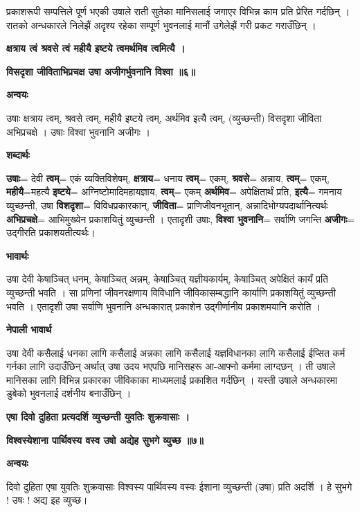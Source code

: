 \documentclass[11pt, a5paper]{article}
\begin{document}
प्रकाशरूपी सम्पत्तिले पूर्ण भएकी उषाले राती सुतेका मानिसलाई जगाएर विभिन्न काम प्रति प्रेरित गर्दछिन् । रातको अन्धकारले निलेझैं अदृश्य रहेका सम्पूर्ण भुवनलाई मानौं उगेलेझैं गरी प्रकट गराउँछिन् ।

\textbf{क्षत्राय त्वं श्रवसे त्वं महीयै इष्टये त्वमर्थमिव त्वमित्यै ।}

\textbf{विसदृशा जीविताभिप्रचक्ष उषा अजीगर्भुवनानि विश्वा ॥६॥}

\textbf{अन्वयः}

उषाः क्षत्राय त्वम्, श्रवसे त्वम्, महीयै इष्टये त्वम्, अर्थमिव इत्यै त्वम्, (व्युच्छन्ती) विसदृशा जीविता अभिप्रचक्षे । उषाः विश्वा भुवनानि अजीगः ।

\textbf{शब्दार्थः}

\textbf{उषाः}= देवी \textbf{त्वम्}= एकं व्यक्तिविशेषम्,  \textbf{क्षत्राय}= धनाय \textbf{त्वम्}= एकम्, \textbf{श्रवसे}= अन्नाय, \textbf{त्वम्}= एकम्, \textbf{महीयै}=महत्यै \textbf{इष्टये}= अग्निष्टोमादिमहायज्ञाय, \textbf{त्वम्}= एकम् \textbf{अर्थमिव}= अपेक्षितार्थं प्रति, \textbf{इत्यै}= गमनाय व्युच्छन्ती, उषा \textbf{विशदृशा}= विविधप्रकारकान्, \textbf{जीविता}= प्राणिजीवनभूतान्, अन्नादिभोग्यपदार्थानित्यर्थः \textbf{अभिप्रचक्षे}= आभिमुख्येन प्रकाशयितुं व्युच्छन्ती । एतादृशी उषाः, \textbf{विश्वा भुवनानि}= सर्वाणि जगन्ति \textbf{अजीगः}= उद्गीरति प्रकाशयतीत्यर्थः।

\textbf{भावार्थः}

उषा देवी केषाञ्चित् धनम्, केषाञ्चित् अन्नम्, केषाञ्चित् यज्ञीयकार्यम्, केषाञ्चित् अपेक्षितं कार्यं प्रति व्युच्छन्ती भवति । सा प्रणिनां जीवनरक्षणाय विविधानि जीविकासम्बद्धानि कार्याणि प्रकाशयितुं व्युच्छन्ती भवति । एतादृशी उषा सर्वाणि भुवनानि अन्धकारात् प्रकाशेन उद्गीर्णानीव प्रकाशमयानि करोति ।

\textbf{नेपाली भावार्थ}

उषा देवी कसैलाई धनका लागि कसैलाई अन्नका लागि कसैलाई यज्ञविधानका लागि कसैलाई ईप्सित कर्म गर्नका लागि उदाउँछिन् अर्थात् उषा उदय भएपछि मानिसहरू आ-आफ्नो कर्ममा लाग्दछन् । ती उषाले मानिसका लागि विभिन्न प्रकारका जीविकाका माध्यमलाई प्रकाशित गर्दछिन् । यस्ती उषाले अन्धकारमा डुबेको भुवनलाई दर्शनीय बनाउँछिन् ।

\textbf{एषा दिवो दुहिता प्रत्यदर्शि व्युच्छन्ती युवतिः शुक्रवासाः ।}

\textbf{विश्वस्येशाना पार्थिवस्य वस्व उषो अद्येह सुभगे व्युच्छ ॥७॥}

\textbf{अन्वयः}

दिवो दुहिता एषा युवतिः शुक्रवासाः विश्वस्य पार्थिवस्य वस्वः ईशाना व्युच्छन्ती (उषा) प्रति अदर्शि । हे सुभगे ! उषः ! अद्य इह व्युच्छ।
\end{document}
